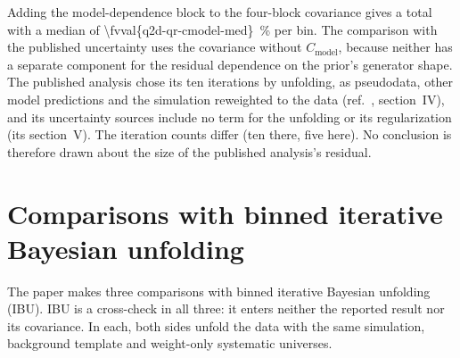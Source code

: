 Adding the model-dependence block to the four-block covariance gives a total with a median of \SI{\fvval{q2d-qr-cmodel-med}}{\percent} per bin.
The comparison with the published uncertainty uses the covariance without $C_{\mathrm{model}}$, because neither has a separate component for the residual dependence on the prior's generator shape. The published analysis chose its ten iterations by unfolding, as pseudodata, other model predictions and the simulation reweighted to the data (ref.~\cite{MINERvA:2021owq}, section~IV), and its uncertainty sources include no term for the unfolding or its regularization (its section~V). The iteration counts differ (ten there, five here). No conclusion is therefore drawn about the size of the published analysis's residual.

\section{Comparisons with binned iterative Bayesian unfolding}
\label{supp:ibu}

The paper makes three comparisons with binned iterative Bayesian unfolding (IBU). IBU is a cross-check in all three: it enters neither the reported result nor its covariance. In each, both sides unfold the data with the same simulation, background template and weight-only systematic universes.

